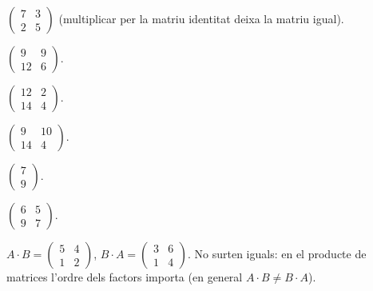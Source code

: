 \begin{solucions}
\begin{sollist}
  \item $\begin{pmatrix} 7 & 3 \\ 2 & 5 \end{pmatrix}$ (multiplicar per la matriu
        identitat deixa la matriu igual).
  \item $\begin{pmatrix} 9 & 9 \\ 12 & 6 \end{pmatrix}$.
  \item $\begin{pmatrix} 12 & 2 \\ 14 & 4 \end{pmatrix}$.
  \item $\begin{pmatrix} 9 & 10 \\ 14 & 4 \end{pmatrix}$.
  \item $\begin{pmatrix} 7 \\ 9 \end{pmatrix}$.
  \item $\begin{pmatrix} 6 & 5 \\ 9 & 7 \end{pmatrix}$.
  \item $A\cdot B=\begin{pmatrix} 5 & 4 \\ 1 & 2 \end{pmatrix}$,
        \;$B\cdot A=\begin{pmatrix} 3 & 6 \\ 1 & 4 \end{pmatrix}$. No surten iguals:
        en el producte de matrices l'ordre dels factors importa (en general
        $A\cdot B\neq B\cdot A$).
\end{sollist}
\end{solucions}
